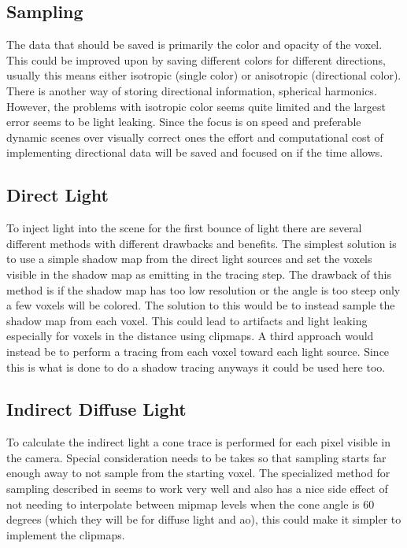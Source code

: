 \documentclass[a4paper, 12pt]{article}
\begin{document}
\subsection{Sampling}

The data that should be saved is primarily the color and opacity of the voxel. This could be improved upon by saving different colors for different directions, usually this means either isotropic (single color) or anisotropic (directional color). There is another way of storing directional information, spherical harmonics. However, the problems with isotropic color seems quite limited and the largest error seems to be light leaking. Since the focus is on speed and preferable dynamic scenes over visually correct ones the effort and computational cost of implementing directional data will be saved and focused on if the time allows.

\subsection{Direct Light}

To inject light into the scene for the first bounce of light there are several different methods with different drawbacks and benefits. The simplest solution is to use a simple shadow map from the direct light sources and set the voxels visible in the shadow map as emitting in the tracing step. The drawback of this method is if the shadow map has too low resolution or the angle is too steep only a few voxels will be colored. The solution to this would be to instead sample the shadow map from each voxel. This could lead to artifacts and light leaking especially for voxels in the distance using clipmaps. A third approach would instead be to perform a tracing from each voxel toward each light source. Since this is what is done to do a shadow tracing anyways it could be used here too.

\subsection{Indirect Diffuse Light}

To calculate the indirect light a cone trace is performed for each pixel visible in the camera. Special consideration needs to be takes so that sampling starts far enough away to not sample from the starting voxel. The specialized method for sampling described in \cite{phdthesis} seems to work very well and also has a nice side effect of not needing to interpolate between mipmap levels when the cone angle is 60 degrees (which they will be for diffuse light and \gls{ao}), this could make it simpler to implement the clipmaps.
\end{document}
